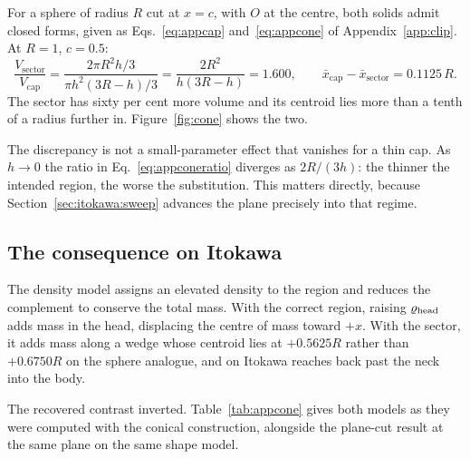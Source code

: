 For a sphere of radius $R$ cut at $x = c$, with $O$ at the centre, both solids
admit closed forms, given as Eqs.~\eqref{eq:appcap} and~\eqref{eq:appcone} of
Appendix~\ref{app:clip}. At $R = 1$, $c = 0.5$:
\begin{equation}
\frac{V_{\mathrm{sector}}}{V_{\mathrm{cap}}}
= \frac{2\pi R^{2}h/3}{\pi h^{2}(3R-h)/3}
= \frac{2R^{2}}{h(3R-h)}
= 1.600 ,
\qquad
\bar{x}_{\mathrm{cap}} - \bar{x}_{\mathrm{sector}} = 0.1125\,R .
\label{eq:appconeratio}
\end{equation}
The sector has sixty per cent more volume and its centroid lies more than a
tenth of a radius further in. Figure~\ref{fig:cone} shows the two.

The discrepancy is not a small-parameter effect that vanishes for a thin cap.
As $h \to 0$ the ratio in Eq.~\eqref{eq:appconeratio} diverges as
$2R/(3h)$: the thinner the intended region, the worse the substitution. This
matters directly, because Section~\ref{sec:itokawa:sweep} advances the plane
precisely into that regime.



\subsection{The consequence on Itokawa}
\label{app:cone:consequence}

The density model assigns an elevated density to the region and reduces the
complement to conserve the total mass. With the correct region, raising
$\varrho_{\mathrm{head}}$ adds mass in the head, displacing the centre of mass toward $+x$.
With the sector, it adds mass along a wedge whose centroid lies at $+0.5625R$
rather than $+0.6750R$ on the sphere analogue, and on Itokawa reaches back past
the neck into the body.

The recovered contrast inverted. Table~\ref{tab:appcone} gives both models as
they were computed with the conical construction, alongside the plane-cut
result at the same plane on the same shape model.

